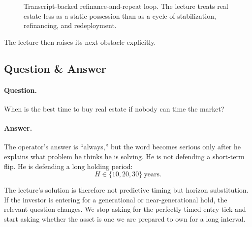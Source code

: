 \begin{figure}[h]
\centering
{}
\caption{Transcript-backed refinance-and-repeat loop. The lecture treats real estate less as a static possession than as a cycle of stabilization, refinancing, and redeployment.}
\end{figure}

The lecture then raises its next obstacle explicitly.

\subsection{Question \& Answer}

\paragraph{Question.}
When is the best time to buy real estate if nobody can time the market?

\paragraph{Answer.}
The operator's answer is ``always,'' but the word becomes serious only after he explains what problem he thinks he is solving. He is not defending a short-term flip. He is defending a long holding period:
\begin{equation}
H \in \{10,20,30\}\ \text{years}.
\end{equation}

The lecture's solution is therefore not predictive timing but horizon substitution. If the investor is entering for a generational or near-generational hold, the relevant question changes. We stop asking for the perfectly timed entry tick and start asking whether the asset is one we are prepared to own for a long interval.


